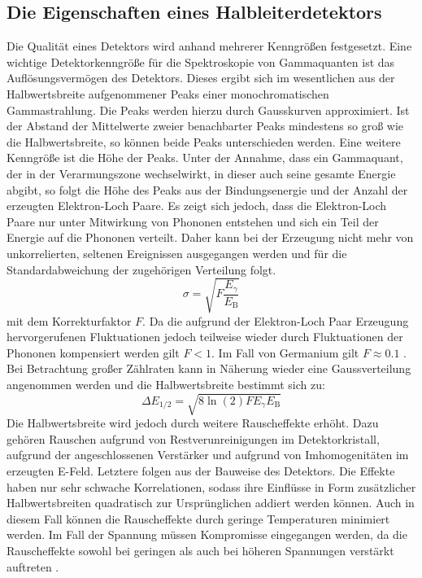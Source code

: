 \subsection{Die Eigenschaften eines Halbleiterdetektors}%
Die Qualität eines Detektors wird anhand mehrerer Kenngrößen festgesetzt.
Eine wichtige Detektorkenngröße für die Spektroskopie von Gammaquanten ist das Auflösungsvermögen des Detektors. Dieses ergibt sich im wesentlichen aus der Halbwertsbreite aufgenommener Peaks einer monochromatischen Gammastrahlung. Die Peaks werden hierzu durch Gausskurven approximiert. Ist der Abstand der Mittelwerte zweier benachbarter Peaks mindestens so groß wie die Halbwertsbreite, so können beide Peaks unterschieden werden. Eine weitere Kenngröße ist die Höhe der Peaks. Unter der Annahme, dass ein Gammaquant, der in der Verarmungszone wechselwirkt, in dieser auch seine gesamte Energie abgibt, so folgt die Höhe des Peaks aus der Bindungsenergie und der Anzahl der erzeugten Elektron-Loch Paare. Es zeigt sich jedoch, dass die Elektron-Loch Paare nur unter Mitwirkung von Phononen entstehen und sich ein Teil der Energie auf die Phononen verteilt. Daher kann bei der Erzeugung nicht mehr von unkorrelierten, seltenen Ereignissen ausgegangen werden und für die Standardabweichung der zugehörigen Verteilung folgt.
\begin{equation}
\sigma = \sqrt{F \frac{E_\gamma}{E_\text{B}} }
\end{equation}
mit dem Korrekturfaktor $F$. Da die aufgrund der Elektron-Loch Paar Erzeugung hervorgerufenen Fluktuationen jedoch teilweise wieder durch Fluktuationen der Phononen kompensiert werden gilt $F < 1$. Im Fall von Germanium gilt $F \approx 0.1$ \cite{V18}. Bei Betrachtung großer Zählraten kann in Näherung wieder eine Gaussverteilung angenommen werden und die Halbwertsbreite bestimmt sich zu:
\begin{equation}
\Delta E_\text{1/2} = \sqrt{8 \ln(2) F E_\gamma E_\text{B}} \label{eq:deltE}
\end{equation}
Die Halbwertsbreite wird jedoch durch weitere Rauscheffekte erhöht. Dazu gehören Rauschen aufgrund von Restverunreinigungen im Detektorkristall, aufgrund der angeschlossenen Verstärker und aufgrund von Imhomogenitäten im erzeugten E-Feld. Letztere folgen aus der Bauweise des Detektors. Die Effekte haben nur sehr schwache Korrelationen, sodass ihre Einflüsse in Form zusätzlicher Halbwertsbreiten quadratisch zur Ursprünglichen addiert werden können. Auch in diesem Fall können die Rauscheffekte durch geringe Temperaturen minimiert werden. Im Fall der Spannung müssen Kompromisse eingegangen werden, da die Rauscheffekte sowohl bei geringen als auch bei höheren Spannungen verstärkt auftreten .

